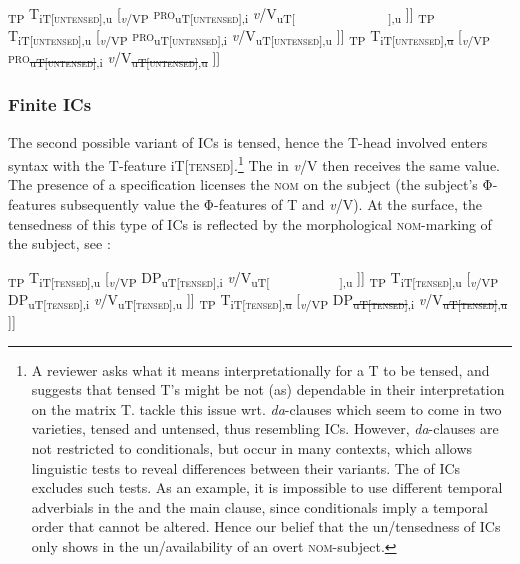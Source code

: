 \documentclass[output=paper,colorlinks,citecolor=brown,newtxmath]{langsci/langscibook}
\begin{document}
\ea\label{ex:nonfinite}
\ea {[}\textsubscript{TP} T\textsubscript{iT[\textsc{untensed}],u\textPhi[~~]} [\textsubscript{\textit{v}/VP} \textsc{pro}\textsubscript{uT[\textsc{untensed}],i\textPhi[~~~]} \textit{v}/V\textsubscript{uT[~~~~~~~~~~~~~~~~],u\textPhi[~~~]} ]]
\ex {[}\textsubscript{TP} T\textsubscript{iT[\textsc{untensed}],u\textPhi[Φ]} [\textsubscript{\textit{v}/VP} \textsc{pro}\textsubscript{uT[\textsc{untensed}],i\textPhi[Φ]} \textit{v}/V\textsubscript{uT[\textsc{untensed}],u\textPhi[Φ]} ]]
\ex {[}\textsubscript{TP} T\textsubscript{iT[\textsc{untensed}],\sout{u\textPhi[Φ]}} [\textsubscript{\textit{v}/VP} \textsc{pro}\textsubscript{\sout{uT[\textsc{untensed}]},i\textPhi[Φ]} \textit{v}/V\textsubscript{\sout{uT[\textsc{untensed}]},\sout{u\textPhi[Φ]}} ]]
\z
\z


\subsubsection{Finite ICs}\label{sec:nom_proposal_finite}

The second possible variant of ICs is tensed, hence the T-head involved enters syntax with the T-feature iT[\textsc{tensed}].\footnote{A reviewer asks what it means interpretationally for a T to be tensed, and suggests that tensed T's might be not (as) dependable in their interpretation on the matrix T. \citet{KrapovaPetkov1999} tackle this issue wrt.  \textit{da}-clauses which seem to come in two varieties, tensed and untensed, thus resembling ICs. However, \textit{da}-clauses are not restricted to conditionals, but occur in many contexts, which allows linguistic tests to reveal differences between their variants. The  of ICs excludes such tests. As an example, it is impossible to use different temporal adverbials in the  and the main clause, since conditionals imply a temporal order that cannot be altered. Hence our belief that the un/tensedness of ICs only shows in the un/availability of an overt \textsc{nom}-subject.} The  in \textit{v}/V then receives the same value. The presence of a  specification licenses the \textsc{nom} on the subject (the subject's Φ-features subsequently value the Φ-features of T and \textit{v}/V). At the surface, the tensedness of this type of ICs is reflected by the morphological \textsc{nom}-marking of the subject, see :

\ea\label{ex:finite}
\ea {[}\textsubscript{TP} T\textsubscript{iT[\textsc{tensed}],u\textPhi[~~]} [\textsubscript{\textit{v}/VP} DP\textsubscript{uT[\textsc{tensed}],i\textPhi[Φ]} \textit{v}/V\textsubscript{uT[~~~~~~~~~~~~],u\textPhi[~~~]} ]]
\ex {[}\textsubscript{TP} T\textsubscript{iT[\textsc{tensed}],u\textPhi[Φ]} [\textsubscript{\textit{v}/VP} DP\textsubscript{uT[\textsc{tensed}],i\textPhi[Φ]} \textit{v}/V\textsubscript{uT[\textsc{tensed}],u\textPhi[Φ]} ]]
\ex {[}\textsubscript{TP} T\textsubscript{iT[\textsc{tensed}],\sout{u\textPhi[Φ]}} [\textsubscript{\textit{v}/VP} DP\textsubscript{\sout{uT[\textsc{tensed}]},i\textPhi[Φ]} \textit{v}/V\textsubscript{\sout{uT[\textsc{tensed}]},\sout{u\textPhi[Φ]}} ]]
\z
\z
\end{document}
